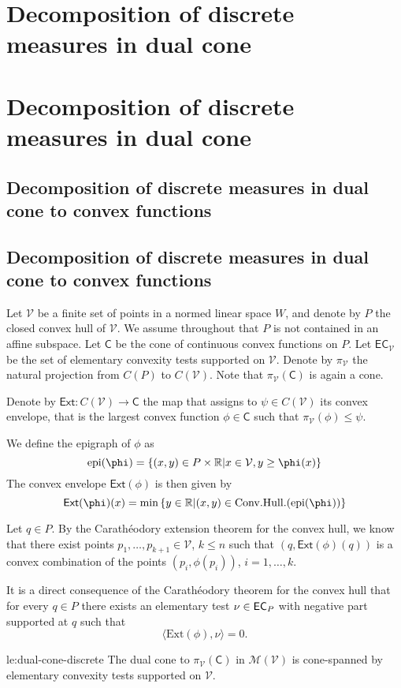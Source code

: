 \documentclass[12pt]{amsart}
\let\Section=\section
\renewcommand{\section}[2][empty]{%
  \xdef\SubsectionName{}%
  \ifthenelse{\equal{#1}{empty}}%
               {\xdef\SectionName{#2}%
                \Section{#2}}%
               {\xdef\SectionName{#1}%
                \Section[#1]{#2}}%
}
\let\Subsection=\subsection
\renewcommand{\subsection}[2][empty]{%
  \ifthenelse{\equal{#1}{empty}}%
               {\xdef\SubsectionName{#2}%
                \Subsection{#2}}%
               {\xdef\SubsectionName{#1}%
                \Subsection[#1]{#2}}%
}
\begin{document}
\section{Decomposition of discrete measures in dual cone}

\subsection{Decomposition of discrete measures in dual cone to convex functions}

Let $\mathcal{V}$ be a finite set of points in a normed linear space $W$, and denote by $P$ the closed convex hull of $\mathcal{V}$. We assume throughout that $P$ is not contained in an affine subspace. 
Let $\mathsf{C}$ be the cone of continuous convex functions on $P$. Let $\mathsf{EC}_{\mathcal{V}}$ be the set of elementary convexity tests supported on $\mathcal{V}$. Denote by $\pi_\mathcal{V}$ the natural projection from $C(P)$ to $C(\mathcal{V})$. Note that $\pi_{\mathcal{V}}(\mathsf{C})$ is again a cone. 

Denote by $\mathsf{Ext}: C(\mathcal{V}) \to \mathsf{C}$ the map that assigns to $\psi \in C(\mathcal{V})$ its convex envelope, that is the largest convex function $\phi \in \mathsf{C}$ such that $\pi_{\mathcal{V}} (\phi) \leq \psi$. 

We define the epigraph of $\phi$ as
\[
\mathrm{epi}(\phi) = \set{ (x, y) \in P \times \mathbb{R} \middle| x \in \mathcal{V}, y \geq \phi(x) }
\]
The convex envelope $\mathsf{Ext}(\phi)$ is then given by
\[
\mathsf{Ext}(\phi) (x)= \min\set{y \in \mathbb{R} \middle| (x,y) \in \mathrm{Conv.Hull.}(\mathrm{epi}(\phi)) }
\]

Let $q \in P$. By the Carath\'eodory extension theorem for the convex hull, we know that there exist points $p_1, \dots, p_{k+1} \in \mathcal{V}$, $k \leq n$ such that $(q, \mathsf{Ext}(\phi) (q))$ is a convex combination of the points $(p_i, \phi(p_i))$, $i=1, \dots,k$.

It is a direct consequence of the Carath\'eodory theorem for the convex hull that for every $q \in P$ there exists an elementary test $\nu \in \mathsf{EC}_P$ with negative part supported at $q$ such that
\[
\langle \mathrm{Ext}(\phi), \nu\rangle = 0.
\]

\begin{lemma}{le:dual-cone-discrete}
The dual cone to $\pi_{\mathcal{V}}(\mathsf{C})$ in $\mathcal{M}(\mathcal{V})$ is cone-spanned by elementary convexity tests supported on $\mathcal{V}$.
\end{lemma}
\end{document}

